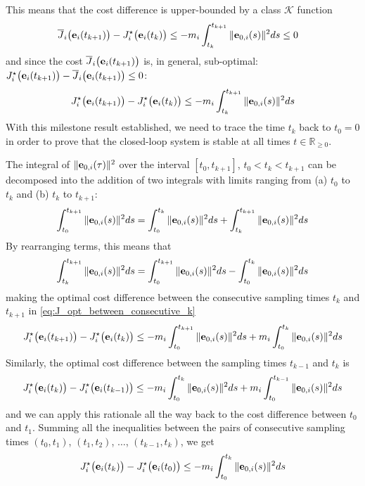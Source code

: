 This means that the cost difference is upper-bounded by a class $\mathcal{K}$
function
\begin{align}
  \overline{J}_i\big(\bm{\mathbf{e}}_i(t_{k+1})\big) - J_i^{\star}\big(\bm{\mathbf{e}}_i(t_k)\big)
  &\leq -m_i \int_{t_k}^{t_{k+1}} \|\bm{\mathbf{e}}_{0,i}(s)\|^2 ds \leq 0
\end{align}
and since the cost $\overline{J}_i\big(\bm{\mathbf{e}}_i(t_{k+1})\big)$ is, in general,
sub-optimal: $J_i^{\star}\big(\bm{\mathbf{e}}_i(t_{k+1})\big) - \overline{J}_i\big(\bm{\mathbf{e}}_i(t_{k+1})\big) \leq 0$:
\begin{align}
 J_i^{\star}\big(\bm{\mathbf{e}}_i(t_{k+1})\big) - J_i^{\star}\big(\bm{\mathbf{e}}_i(t_k)\big) \leq -m_i \int_{t_k}^{t_{k+1}} \|\bm{\mathbf{e}}_{0,i}(s)\|^2 ds
 \label{eq:J_opt_between_consecutive_k}
\end{align}
With this milestone result established, we need to trace the time $t_k$ back
to $t_0 = 0$ in order to prove that the closed-loop system is stable at all
times $t \in \mathbb{R}_{\geq 0}$.

\begin{gg_box}
  The integral of $\|\bm{\mathbf{e}}_{0,i}(\tau)\|^2$ over the interval $[t_0, t_{k+1}]$,
  $t_0 < t_k < t_{k+1}$ can be decomposed into the addition of two integrals
  with limits ranging from (a) $t_0$ to $t_k$ and (b) $t_k$ to $t_{k+1}$:
  \begin{align}
    \int_{t_0}^{t_{k+1}} \|\bm{\mathbf{e}}_{0,i}(s)\|^2 ds = \int_{t_0}^{t_{k}} \|\bm{\mathbf{e}}_{0,i}(s)\|^2 ds + \int_{t_k}^{t_{k+1}} \|\bm{\mathbf{e}}_{0,i}(s)\|^2 ds
  \end{align}
  By rearranging terms, this means that
  \begin{align}
    \int_{t_k}^{t_{k+1}} \|\bm{\mathbf{e}}_{0,i}(s)\|^2 ds = \int_{t_0}^{t_{k+1}} \|\bm{\mathbf{e}}_{0,i}(s)\|^2 ds - \int_{t_0}^{t_{k}} \|\bm{\mathbf{e}}_{0,i}(s)\|^2 ds
  \end{align}
  making the optimal cost difference between the consecutive sampling times
  $t_k$ and $t_{k+1}$ in \eqref{eq:J_opt_between_consecutive_k}
  \begin{align}
    J_i^{\star}\big(\bm{\mathbf{e}}_i(t_{k+1})\big) - J_i^{\star}\big(\bm{\mathbf{e}}_i(t_k)\big) \leq
      -m_i \int_{t_0}^{t_{k+1}} \|\bm{\mathbf{e}}_{0,i}(s)\|^2 ds +m_i \int_{t_0}^{t_{k}} \|\bm{\mathbf{e}}_{0,i}(s)\|^2 ds
  \end{align}
  Similarly, the optimal cost difference between the sampling times $t_{k-1}$
  and $t_{k}$ is
  \begin{align}
    J_i^{\star}\big(\bm{\mathbf{e}}_i(t_{k})\big) - J_i^{\star}\big(\bm{\mathbf{e}}_i(t_{k-1})\big) \leq
      -m_i \int_{t_0}^{t_{k}} \|\bm{\mathbf{e}}_{0,i}(s)\|^2 ds +m_i \int_{t_0}^{t_{k-1}} \|\bm{\mathbf{e}}_{0,i}(s)\|^2 ds
  \end{align}
  and we can apply this rationale all the way back to the cost difference
  between $t_0$ and $t_1$. Summing all the inequalities between the pairs of
  consecutive sampling times $(t_0, t_1)$, $(t_1, t_2)$, $\dots$,
  $(t_{k-1}, t_k)$, we get
  \begin{align}
    J_i^{\star}\big(\bm{\mathbf{e}}_i(t_{k})\big) - J_i^{\star}\big(\bm{\mathbf{e}}_i(t_0)\big) \leq
      -m_i \int_{t_0}^{t_{k}} \|\bm{\mathbf{e}}_{0,i}(s)\|^2 ds
  \end{align}
\end{gg_box}

